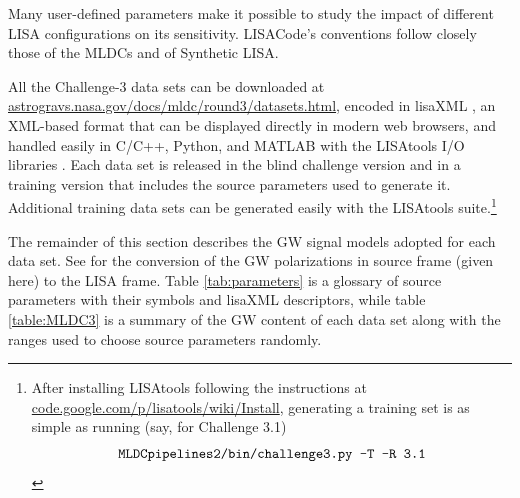 \documentclass{iopart}
\begin{document}
Many user-defined parameters make it possible to study the impact of different LISA configurations on its sensitivity. LISACode's conventions follow closely those of the MLDCs and of Synthetic LISA.

All the Challenge-3 data sets can be downloaded at \url{astrogravs.nasa.gov/docs/mldc/round3/datasets.html}, encoded in lisaXML \cite{mldclisasymp}, an XML-based format that can be displayed directly in modern web browsers, and handled easily in C/C++, Python, and MATLAB with the LISAtools I/O libraries \cite{lisatools}. Each data set is released in the blind challenge version and in a training version that includes the source parameters used to generate it. Additional training data sets can be generated easily with the LISAtools suite.\footnote{After installing LISAtools following the instructions at \url{code.google.com/p/lisatools/wiki/Install}, generating a training set is as simple as running (say, for Challenge 3.1) 
\begin{displaymath}
\mbox{\texttt{MLDCpipelines2/bin/challenge3.py -T -R 3.1}}
\end{displaymath}}

The remainder of this section describes the GW signal models adopted for each data set. 
See \cite{mldcgwdaw2} for the conversion of the GW polarizations in source frame (given here) to the LISA frame. Table \ref{tab:parameters} is a glossary of source parameters with their symbols and lisaXML descriptors, while table \ref{table:MLDC3} is a summary of the GW content of each data set along with the ranges used to choose source parameters randomly.
\end{document}
